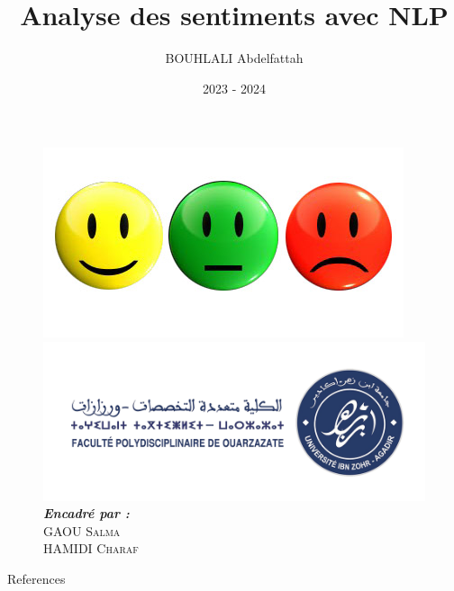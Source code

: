 \documentclass[10pt,hyperref={colorlinks,citecolor=blue,urlcolor=peking_blue,linkcolor=}]{beamer}
\author[BOUHLALI Abdelfattah]{BOUHLALI Abdelfattah}
\title{Analyse des sentiments avec NLP}
\subtitle{}
\institute{Master Mathématiques Appliquées pour la Science des Données}
\date{2023 - 2024}
\theoremstyle{plain}
\newif\ifplacelogo %
\begin{document}
{
\begin{frame}
    \titlepage
    \begin{figure}[htpb]
        \begin{center}
        
            \includegraphics[width=0.2\linewidth]{Figures/imogies.jpg}\\
            
            \includegraphics[width=0.3\linewidth]{Figures/fpo_logo.png} \\
            
            \emph{\textbf{Encadré par :}}\\ 
            \textsc{GAOU Salma} \\
            \textsc{HAMIDI Charaf}
            
        \end{center}
    \end{figure}
\end{frame}
}

\placelogofalse











\begin{frame}{References}%
    \renewcommand*{\bibfont}{\footnotesize}
    
    
\end{frame}



\end{document}
